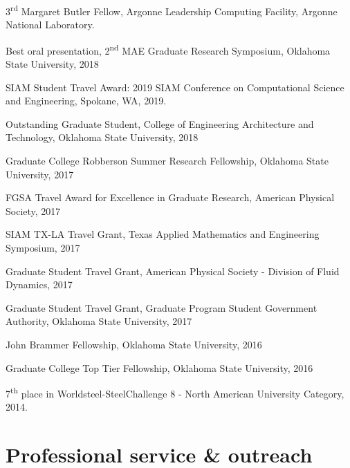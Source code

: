 \documentclass[letterpaper]{article}
\renewenvironment{itemize}{
  \begin{list}{}{
    \setlength{\leftmargin}{1.5em}
  }
}{
  \end{list}
}
\begin{document}
\begin{itemize}

\item 3\textsuperscript{rd} Margaret Butler Fellow, Argonne Leadership Computing Facility, Argonne National Laboratory.

\item Best oral presentation, 2\textsuperscript{nd} MAE Graduate Research Symposium, Oklahoma State University, 2018

\item SIAM Student Travel Award: 2019 SIAM Conference on Computational Science and Engineering, Spokane, WA, 2019.

\item Outstanding Graduate Student, College of Engineering Architecture and Technology, Oklahoma State University, 2018

\item Graduate College Robberson Summer Research Fellowship, Oklahoma State University, 2017

\item FGSA Travel Award for Excellence in Graduate Research, American Physical Society, 2017

\item SIAM TX-LA Travel Grant, Texas Applied Mathematics and Engineering Symposium, 2017

\item Graduate Student Travel Grant, American Physical Society - Division of Fluid Dynamics, 2017

\item Graduate Student Travel Grant, Graduate Program Student Government Authority, Oklahoma State University, 2017

\item John Brammer Fellowship, Oklahoma State University, 2016

\item Graduate College Top Tier Fellowship, Oklahoma State University, 2016

\item 7\textsuperscript{th} place in Worldsteel-SteelChallenge 8 - North American University Category, 2014.
\end{itemize}

\section*{Professional service \& outreach}
\end{document}
